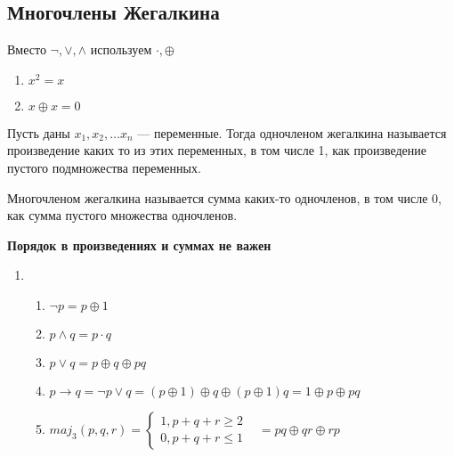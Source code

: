 
\subsection{Многочлены Жегалкина}

Вместо $\neg, \vee, \wedge$ используем $\cdot, \oplus$
\begin{note}
    \begin{enumerate}
        \item $x^2 = x$
        \item $x \oplus x = 0$
    \end{enumerate}
\end{note}

\begin{definition}
    Пусть даны $x_1, x_2, \dots x_n$ --- переменные. Тогда одночленом жегалкина называется произведение каких то из этих переменных, в том числе 1, как произведение пустого подмножества переменных.
\end{definition}

\begin{definition}
    Многочленом жегалкина называется сумма каких-то одночленов, в том числе 0, как сумма пустого множества одночленов. 
\end{definition}

\begin{center}
    \textbf{Порядок в произведениях и суммах не важен}
\end{center}


\begin{enumerate}
    \item \begin{enumerate}
        \item $\neg p = p \oplus 1$
        \item $p \wedge q = p\cdot q$
        \item $p \vee q = p \oplus q \oplus pq$
        \item $p \rightarrow q = \neg p \vee q = (p \oplus 1) \oplus q \oplus (p \oplus 1)q = 1 \oplus p \oplus pq$
        \item $maj_3(p, q, r) = \left\{\begin{array}{cc}
            1, p + q + r \ge 2  \\
            0, p + q + r \le 1 & 
        \end{array}\right. = pq \oplus qr \oplus rp$
    \end{enumerate}    
\end{enumerate}

